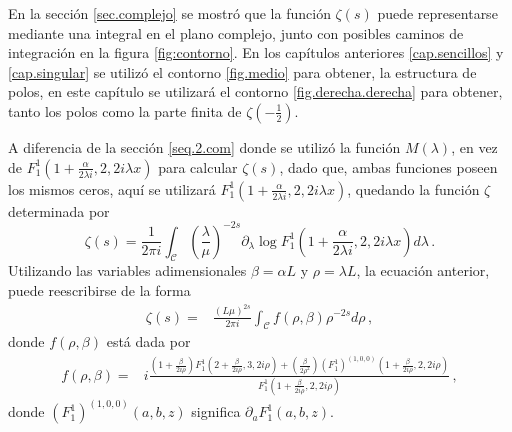 En la sección \ref{sec.complejo} se mostró que la función $\zeta (s)$ puede representarse mediante una integral en el plano complejo, junto con posibles caminos de integración en la figura \ref{fig:contorno}. En los capítulos anteriores \ref{cap.sencillos}  y \ref{cap.singular} se utilizó el contorno \ref{fig.medio} para obtener, la estructura de polos, en este capítulo se utilizará el contorno \ref{fig.derecha.derecha} para obtener, tanto los polos como la parte finita  de  $\zeta \left( - \frac{1}{2} \right)$.

A diferencia de la sección \ref{seq.2.com} donde se utilizó la función $M (\lambda )$, en vez de $F _1 ^{1} \left( 1+\frac{ \alpha}{2 \lambda i },2,2 i \lambda x \right)$ para calcular $\zeta (s)$, dado que, ambas funciones poseen los mismos ceros, aquí se utilizará 
$F _1 ^{1} \left( 1+\frac{ \alpha}{2 \lambda i },2,2 i \lambda x \right)$, quedando la función $\zeta$ determinada por
\begin{equation}
	\zeta (s) = 
	\frac{1}{2 \pi i} \int _{\mathcal{C}} 
						\left( \frac{\lambda}{\mu} \right) ^{-2s}
						\partial _ \lambda 
						\log F _1 ^{1} 
						\left( 1+\frac{ \alpha}{2 \lambda i },
							2,2 i \lambda x 
							\right)												
						d \lambda
	\, .
\end{equation}
Utilizando las variables adimensionales $\beta = \alpha L$ y  $\rho = \lambda L$, la ecuación anterior, puede reescribirse de la forma
\begin{align}
\label{eq.ultima.int}
	\zeta (s) =& 
	\frac{\left(L \mu \right)^{2s}}{2 \pi i} \int _{\mathcal{C}} 
	f (\rho , \beta) \rho ^{-2s} d \rho 
\, ,
\end{align}
donde $f( \rho, \beta)$ está dada por
\begin{align}
f(\rho, \beta) =& 	
i
\frac{
		\left(1 + \frac{ \beta}{2 i \rho} \right) 
		F _1 ^1 
			\left( 2 + \frac{ \beta}{2 i \rho} ,3 ,2 i \rho \right)
		+ \left( \frac{\beta				
				}
				{2 \rho ^2 } 
				\right)
				( F _{1} ^1 ) ^{(1,0,0)}
				\left( 1 + \frac{\beta}{2 i \rho} ,2 ,2 i \rho
						\right)
		}
		{F _1 ^1 \left( 1 + \frac{\beta}{2 i \rho},2,2 i \rho \right)} 
\, ,	
\nonumber
\end{align}
donde $( F _{1} ^1 ) ^{(1,0,0)} (a,b,z)$ significa $ \partial _a F _{1} ^1  (a,b,z)$.


